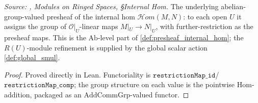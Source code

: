 \begin{definition}\leanok
  \label{def:internal_hom_presheaf}
  \textit{Source: \cite{stacks-project}, Modules on Ringed Spaces, \S Internal Hom.}
  The underlying abelian-group-valued presheaf of the internal hom
  \(\mathcal{H}om(M, N)\): to each open \(U\) it assigns the group of
  \(\mathcal{O}|_U\)-linear maps \(M|_U \to N|_U\), with further-restriction as the
  presheaf maps. This is the \(\mathrm{Ab}\)-level part of
  \cref{def:presheaf_internal_hom}; the \(R(U)\)-module refinement is supplied by the
  global scalar action \cref{def:global_smul}.
\end{definition}
\begin{proof}
  \leanok
  Proved directly in Lean. Functoriality is \(\mathtt{restrictionMap\_id}\)/%
  \(\mathtt{restrictionMap\_comp}\); the group structure on each value is the pointwise
  \(\mathrm{Hom}\)-addition, packaged as an \(\mathrm{AddCommGrp}\)-valued functor.
\end{proof}

